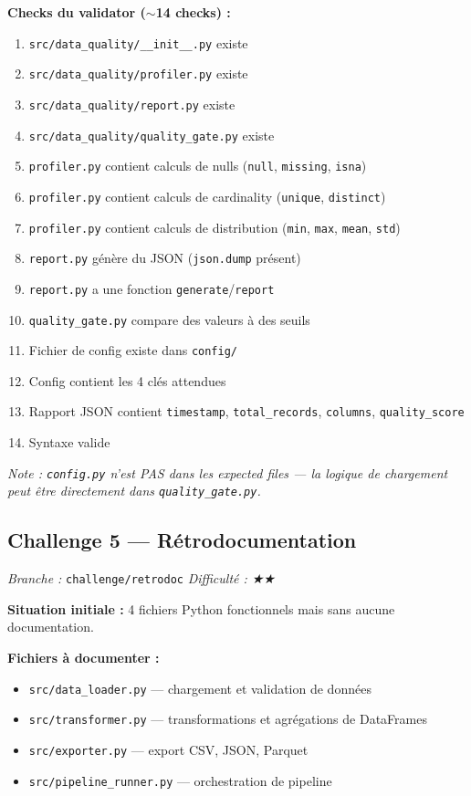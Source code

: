 \documentclass[11pt,a4paper]{article}
\newcommand{\code}[1]{\texttt{#1}}
\begin{document}
\textbf{Checks du validator ($\sim$14 checks) :}
\begin{enumerate}
  \item \code{src/data\_quality/\_\_init\_\_.py} existe
  \item \code{src/data\_quality/profiler.py} existe
  \item \code{src/data\_quality/report.py} existe
  \item \code{src/data\_quality/quality\_gate.py} existe
  \item \code{profiler.py} contient calculs de nulls (\code{null}, \code{missing}, \code{isna})
  \item \code{profiler.py} contient calculs de cardinality (\code{unique}, \code{distinct})
  \item \code{profiler.py} contient calculs de distribution (\code{min}, \code{max}, \code{mean}, \code{std})
  \item \code{report.py} génère du JSON (\code{json.dump} présent)
  \item \code{report.py} a une fonction \code{generate}/\code{report}
  \item \code{quality\_gate.py} compare des valeurs à des seuils
  \item Fichier de config existe dans \code{config/}
  \item Config contient les 4 clés attendues
  \item Rapport JSON contient \code{timestamp}, \code{total\_records}, \code{columns}, \code{quality\_score}
  \item Syntaxe valide
\end{enumerate}

\textit{Note : \code{config.py} n'est PAS dans les expected files — la logique de chargement
peut être directement dans \code{quality\_gate.py}.}

\subsection{Challenge 5 — Rétrodocumentation}
\textit{Branche :} \code{challenge/retrodoc} \quad \textit{Difficulté : ★★}

\textbf{Situation initiale :}
4 fichiers Python fonctionnels mais sans aucune documentation.

\textbf{Fichiers à documenter :}
\begin{itemize}
  \item \code{src/data\_loader.py} — chargement et validation de données
  \item \code{src/transformer.py} — transformations et agrégations de DataFrames
  \item \code{src/exporter.py} — export CSV, JSON, Parquet
  \item \code{src/pipeline\_runner.py} — orchestration de pipeline
\end{itemize}
\end{document}
